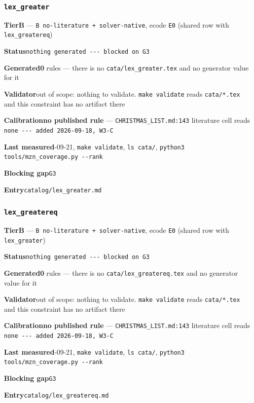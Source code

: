 \documentclass[10pt,a4paper]{article}
\newcommand{\entryfield}[2]{{\raggedright\textbf{#1}\quad #2\par}}
\begin{document}
\subsubsection*{\texttt{lex\_\allowbreak{}greater}}
\label{entry:lex-greater}
\entryfield{Tier}{\textbf{B} --- \texttt{B no-\allowbreak{}literature + solver-\allowbreak{}native}, ecode \texttt{E0} (shared row with \texttt{lex\_greatereq})}
\entryfield{Status}{\texttt{nothing generated -\allowbreak{}-\allowbreak{}-\allowbreak{} blocked on G3}}
\entryfield{Generated}{\textbf{0} rules --- there is no \texttt{cata/lex\_greater.tex} and no generator value for it}
\entryfield{Validator}{out of scope: nothing to validate. \texttt{make validate} reads \texttt{cata/*.tex} and this constraint has no artifact there}
\entryfield{Calibration}{\textbf{no published rule} --- \texttt{CHRISTMAS\_LIST.md:143} literature cell reads \texttt{none -\allowbreak{}-\allowbreak{}-\allowbreak{} added 2026-\allowbreak{}09-\allowbreak{}18, W3-\allowbreak{}C}}
\entryfield{Last measured}{2026-09-21, \texttt{make validate}, \texttt{ls cata/}, \texttt{python3 tools/\allowbreak{}mzn\_\allowbreak{}coverage.\allowbreak{}py -\allowbreak{}-\allowbreak{}rank}}
\entryfield{Blocking gap}{\texttt{G3}}
\entryfield{Entry}{\texttt{catalog/lex\_greater.md}}
\subsubsection*{\texttt{lex\_\allowbreak{}greatereq}}
\label{entry:lex-greatereq}
\entryfield{Tier}{\textbf{B} --- \texttt{B no-\allowbreak{}literature + solver-\allowbreak{}native}, ecode \texttt{E0} (shared row with \texttt{lex\_greater})}
\entryfield{Status}{\texttt{nothing generated -\allowbreak{}-\allowbreak{}-\allowbreak{} blocked on G3}}
\entryfield{Generated}{\textbf{0} rules --- there is no \texttt{cata/lex\_greatereq.tex} and no generator value for it}
\entryfield{Validator}{out of scope: nothing to validate. \texttt{make validate} reads \texttt{cata/*.tex} and this constraint has no artifact there}
\entryfield{Calibration}{\textbf{no published rule} --- \texttt{CHRISTMAS\_LIST.md:143} literature cell reads \texttt{none -\allowbreak{}-\allowbreak{}-\allowbreak{} added 2026-\allowbreak{}09-\allowbreak{}18, W3-\allowbreak{}C}}
\entryfield{Last measured}{2026-09-21, \texttt{make validate}, \texttt{ls cata/}, \texttt{python3 tools/\allowbreak{}mzn\_\allowbreak{}coverage.\allowbreak{}py -\allowbreak{}-\allowbreak{}rank}}
\entryfield{Blocking gap}{\texttt{G3}}
\entryfield{Entry}{\texttt{catalog/lex\_greatereq.md}}
\end{document}
